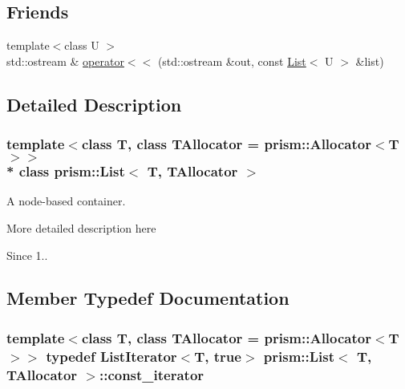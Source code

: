 \subsection*{Friends}
\begin{DoxyCompactItemize}
\item 
{\footnotesize template$<$class U $>$ }\\std\+::ostream \& \hyperlink{classprism_1_1_list_a4f7eba75beff2a794a33fa6eef7ef601}{operator$<$$<$} (std\+::ostream \&out, const \hyperlink{classprism_1_1_list}{List}$<$ U $>$ \&list)
\end{DoxyCompactItemize}


\subsection{Detailed Description}
\subsubsection*{template$<$class T, class T\+Allocator = prism\+::\+Allocator$<$\+T$>$$>$\\*
class prism\+::\+List$<$ T, T\+Allocator $>$}

A node-\/based container. 

More detailed description here

\begin{DoxySince}{Since}
1.. 
\end{DoxySince}


\subsection{Member Typedef Documentation}
\subsubsection[{\texorpdfstring{const\+\_\+iterator}{const_iterator}}]{\setlength{\rightskip}{0pt plus 5cm}template$<$class T, class T\+Allocator = prism\+::\+Allocator$<$\+T$>$$>$ typedef List\+Iterator$<$T, true$>$ {\bf prism\+::\+List}$<$ T, T\+Allocator $>$\+::{\bf const\+\_\+iterator}}\hypertarget{classprism_1_1_list_aafd1fe9c849b0369c3bf7bb0d456e0a3}{}\label{classprism_1_1_list_aafd1fe9c849b0369c3bf7bb0d456e0a3}

